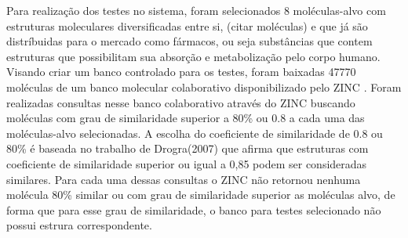 Para realização dos testes no sistema, foram selecionados 8 moléculas-alvo  com estruturas moleculares diversificadas entre si, (citar moléculas) e que já são distríbuidas para o mercado como fármacos, ou seja substâncias que contem estruturas que possibilitam sua absorção e metabolização pelo corpo humano. Visando criar um banco controlado para os testes, foram baixadas 47770 moléculas de um banco molecular colaborativo disponibilizado pelo ZINC \cite{irwin2005zinc}. Foram realizadas consultas nesse banco colaborativo através do ZINC buscando moléculas com grau de similaridade superior a 80\% ou 0.8 a cada uma das moléculas-alvo selecionadas. A escolha do coeficiente de similaridade de 0.8 ou 80\% é baseada no trabalho de Drogra(2007) que afirma que estruturas com coeficiente de similaridade superior ou igual a 0,85 podem ser consideradas similares. Para cada uma dessas consultas o ZINC não retornou nenhuma molécula 80\% similar ou com grau de similaridade superior as moléculas alvo, de forma que para esse grau de similaridade, o banco para testes selecionado não possui estrura correspondente. 

   
